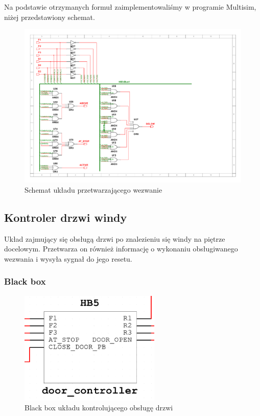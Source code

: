\documentclass[a4paper]{article}
\begin{document}
Na podstawie otrzymanych formuł zaimplementowaliśmy w programie Multisim,
niżej przedstawiony schemat.

\begin{figure}[H]
    \centering
    \includegraphics[width=\textwidth]{direction_controller_schemat.pdf}
    \caption{Schemat układu przetwarzającego wezwanie}
\end{figure}

\subsection{Kontroler drzwi windy}

Układ zajmujący się obsługą drzwi po znalezieniu się windy na piętrze docelowym. 
Przetwarza on również informację o wykonaniu obsługiwanego wezwania
i wysyła sygnał do jego resetu.

\subsubsection{Black box}
\begin{figure}[H]
    \centering
    \includegraphics[width=0.6\textwidth]{door_controller.png}
    \caption{Black box układu kontrolującego obsługę drzwi}
\end{figure}
\end{document}
